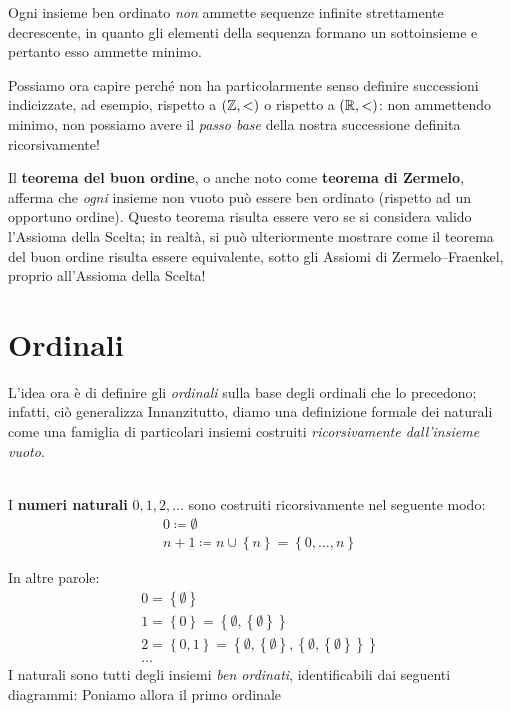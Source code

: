 \begin{observe}
	Ogni insieme ben ordinato \textit{non} ammette sequenze infinite strettamente decrescente, in quanto gli elementi della sequenza formano un sottoinsieme e pertanto esso ammette minimo.
\end{observe}
\begin{intuit}
	Possiamo ora capire perché non ha particolarmente senso definire successioni indicizzate, ad esempio, rispetto a $\left(\mathbb{Z},<\right)$ o rispetto a $\left(\mathbb{R},<\right)$: non ammettendo minimo, non possiamo avere il \textit{passo base} della nostra successione definita ricorsivamente!
\end{intuit}
\begin{digression}
	Il \textbf{teorema del buon ordine}, o anche noto come \textbf{teorema di Zermelo}, afferma che \textit{ogni} insieme non vuoto può essere ben ordinato (rispetto ad un opportuno ordine). Questo teorema risulta essere vero se si considera valido l'Assioma della Scelta; in realtà, si può ulteriormente mostrare come il teorema del buon ordine risulta essere equivalente, sotto gli Assiomi di Zermelo–Fraenkel, proprio all'Assioma della Scelta!
\end{digression}
\section{Ordinali}
L'idea ora è di definire gli \textit{ordinali} sulla base degli ordinali che lo precedono; infatti, ciò generalizza %
Innanzitutto, diamo una definizione formale dei naturali come una famiglia di particolari insiemi costruiti \textit{ricorsivamente dall'insieme vuoto}.
\begin{define}~{}\\
	I \textbf{numeri naturali} $0,1,2,\ldots$ sono costruiti ricorsivamente nel seguente modo:
	\begin{equation}
		\begin{array}{l}
			0\coloneqq \emptyset\\
			n+1\coloneqq n\cup \left\{n\right\} = \left\{0,\ldots,n\right\}
		\end{array}
	\end{equation}
\end{define}
In altre parole:
\begin{equation*}
	\begin{array}{l}
		0=\left\{\emptyset\right\}\\
		1=\left\{0\right\}=\left\{\emptyset,\left\{\emptyset\right\}\right\}\\
		2=\left\{0,1\right\}=\left\{\emptyset,\left\{\emptyset\right\}, \left\{\emptyset,\left\{\emptyset\right\}\right\}\right\}\\
		\dots
	\end{array}
\end{equation*}
I naturali sono tutti degli insiemi \textit{ben ordinati}, identificabili dai seguenti diagrammi:
Poniamo allora il primo ordinale
